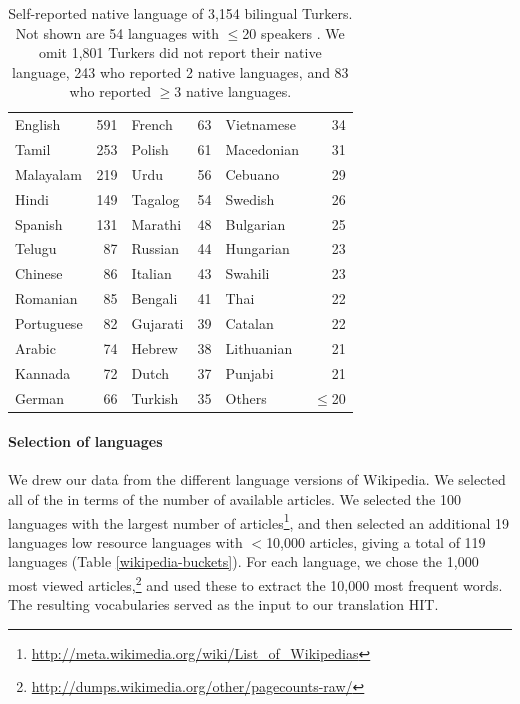 \documentclass[11pt]{article}
\begin{document}
\begin{table}[h]
\footnotesize
\begin{tabular}{lrlrlr}\hline\hline
\hline
English&591&	French&63&	Vietnamese&34\\
Tamil&253&	Polish&61&	Macedonian&31\\
Malayalam&219&	Urdu&56&	Cebuano&29\\
Hindi&149&	Tagalog&54&	Swedish&26\\
Spanish&131&	Marathi&48&	Bulgarian&25\\
Telugu&87&	Russian&44&	Hungarian&23\\
Chinese&86&	Italian&43&	Swahili&23\\
Romanian&85&	Bengali&41&	Thai&22\\
Portuguese&82&	Gujarati&39&	Catalan&22\\
Arabic&74&	Hebrew&38&	Lithuanian&21\\
Kannada&72&	Dutch&37&	Punjabi&21\\
German&66&	Turkish&35&	Others &$\leq$20\\
\hline\hline
\end{tabular}
\normalsize
\caption{Self-reported native language of 3,154 bilingual Turkers. Not shown are 54 languages with $\leq$20 speakers . 
We omit 1,801 Turkers did not report their native language, 243 who reported 2 native languages, and 83 who reported $\geq$3 native languages.}\label{lang-pie}
\end{table}



\paragraph{Selection of languages}

We drew our data from the different language versions of Wikipedia.  We selected all of the  in terms of the number of available articles.  We selected the 100 languages with the largest number of articles\footnote{\url{http://meta.wikimedia.org/wiki/List_of_Wikipedias}}, and then selected an additional 19 languages low resource languages with $<$10,000 articles, giving a total of 119 languages (Table \ref{wikipedia-buckets}). For each language, we chose the 1,000 most viewed articles,\footnote{\url{http://dumps.wikimedia.org/other/pagecounts-raw/}} and used these to extract the 10,000 most frequent words. The resulting vocabularies served as the input to our translation HIT.
\end{document}
